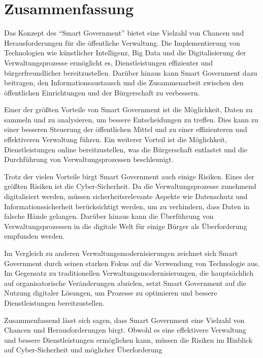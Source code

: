\section{Zusammenfassung}
Das Konzept des ``Smart Government'' bietet eine Vielzahl von Chancen und Herausforderungen für die öffentliche Verwaltung. 
Die Implementierung von Technologien wie künstlicher Intelligenz, Big Data und die Digitalisierung der Verwaltungsprozesse ermöglicht es, Dienstleistungen effizienter und bürgerfreundlicher bereitzustellen. 
Darüber hinaus kann Smart Government dazu beitragen, den Informationsaustausch und die Zusammenarbeit zwischen den öffentlichen Einrichtungen und der Bürgerschaft zu verbessern.

Einer der größten Vorteile von Smart Government ist die Möglichkeit, Daten zu sammeln und zu analysieren, um bessere Entscheidungen zu treffen. Dies kann zu einer besseren Steuerung der öffentlichen Mittel und zu einer effizienteren und effektiveren Verwaltung führen. 
Ein weiterer Vorteil ist die Möglichkeit, Dienstleistungen online bereitzustellen, was die Bürgerschaft entlastet und die Durchführung von Verwaltungsprozessen beschleunigt.

Trotz der vielen Vorteile birgt Smart Government auch einige Risiken. 
Eines der größten Risiken ist die Cyber-Sicherheit. Da die Verwaltungsprozesse zunehmend digitalisiert werden, müssen sicherheitsrelevante Aspekte wie Datenschutz und Informationssicherheit berücksichtigt werden, um zu verhindern, dass Daten in falsche Hände gelangen. 
Darüber hinaus kann die Überführung von Verwaltungsprozessen in die digitale Welt für einige Bürger als Überforderung empfunden werden.

Im Vergleich zu anderen Verwaltungsmodernisierungen zeichnet sich Smart Government durch seinen starken Fokus auf die Verwendung von Technologie aus. 
Im Gegensatz zu traditionellen Verwaltungsmodernisierungen, die hauptsächlich auf organisatorische Veränderungen abzielen, setzt Smart Government auf die Nutzung digitaler Lösungen, um Prozesse zu optimieren und bessere Dienstleistungen bereitzustellen.

Zusammenfassend lässt sich sagen, dass Smart Government eine Vielzahl von Chancen und Herausforderungen birgt. 
Obwohl es eine effektivere Verwaltung und bessere Dienstleistungen ermöglichen kann, müssen die Risiken im Hinblick auf Cyber-Sicherheit und möglicher Überforderung